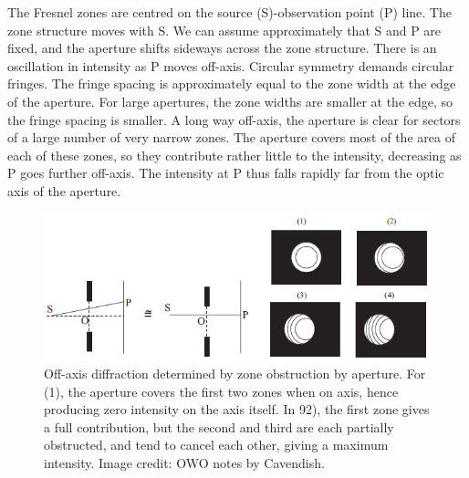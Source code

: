 \documentclass[a4paper]{article}
\begin{document}
\begin{Note}
The Fresnel zones are centred on the source (S)-observation point (P) line. The zone structure moves with S. We can assume approximately that S and P are fixed, and the aperture shifts sideways across the zone structure. There is an oscillation in intensity as P moves off-axis. Circular symmetry demands circular fringes. The fringe spacing is approximately equal to the zone width at the edge of the aperture. For large apertures, the zone widths are smaller at the edge, so the fringe spacing is smaller. A long way off-axis, the aperture is clear for sectors of a large number of very narrow zones. The aperture covers most of the area of each of these zones, so they contribute rather little to the intensity, decreasing as P goes further off-axis. The intensity at P thus falls rapidly far from the optic axis of the aperture.
\end{Note}
\begin{figure}[H]
    \centering
    \includegraphics[width=\linewidth]{fresnelcircularoff.PNG}
    \caption{Off-axis diffraction determined by zone obstruction by aperture. For (1), the aperture covers the first two zones when on axis, hence producing zero intensity on the axis itself. In 92), the first zone gives a full contribution, but the second and third are each partially obstructed, and tend to cancel each other, giving a maximum intensity. Image credit: OWO notes by Cavendish.}
\end{figure}
\newpage
\end{document}
